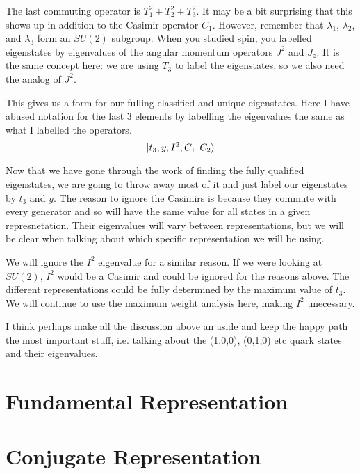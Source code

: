 \documentclass[12pt]{article}
\newcommand{\aside}[2]{#1}
\begin{document}
The last commuting operator is $T_1^2+T_2^2+T_3^2$. It may be a bit surprising that this shows up in addition to the Casimir operator $C_1$. However, remember that $\lambda_1$, $\lambda_2$, and $\lambda_3$ form an $SU(2)$ subgroup. When you studied spin, you labelled eigenstates by eigenvalues of the angular momentum operators $J^2$ and $J_z$. It is the same concept here: we are using $T_3$ to label the eigenstates, so we also need the analog of $J^2$.

This gives us a form for our fulling classified and unique eigenstates. Here I have abused notation for the last 3 elements by labelling the eigenvalues the same as what I labelled the operators.
\begin{equation}
    \ket{t_3, y, I^2, C_1, C_2}
\end{equation}

Now that we have gone through the work of finding the fully qualified eigenstates, we are going to throw away most of it and just label our eigenstates by $t_3$ and $y$. The reason to ignore the Casimirs is because they commute with every generator and so will have the same value for all states in a given represnetation. Their \aside{eigenvalues will vary between representations}{Why do casimirs have different values for differen representations}, but we will be clear when talking about which specific representation we will be using. 

We will ignore the $I^2$ eigenvalue for a similar reason. If we were looking at $SU(2)$, $I^2$ would be a Casimir and could be ignored for the reasons above. The different representations could be fully determined by the maximum value of $t_3$. We will continue to use the maximum \aside{weight}{What is weight} analysis here, making $I^2$ unecessary.

I think perhaps make all the discussion above an aside and keep the happy path the most important stuff, i.e. talking about the (1,0,0), (0,1,0) etc quark states and their eigenvalues.

\section{Fundamental Representation}

\section{Conjugate Representation}
\end{document}
